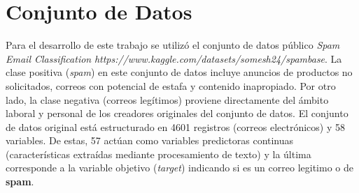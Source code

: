 \documentclass[a4paper,11pt]{book}
\begin{document}
\section{Conjunto de Datos}
Para el desarrollo de este trabajo se utilizó el conjunto de datos público \textit{Spam Email Classification}  \textit{https://www.kaggle.com/datasets/somesh24/spambase}. La clase positiva (\textit{spam}) en este conjunto de datos incluye anuncios de productos no solicitados, correos con potencial de estafa  y contenido inapropiado. Por otro lado, la clase negativa (correos legítimos) proviene directamente del ámbito laboral y personal de los creadores originales del conjunto de datos.
El conjunto de datos original está estructurado en 4601 registros (correos electrónicos) y 58 variables. De estas, 57 actúan como variables predictoras continuas (características extraídas mediante procesamiento de texto) y la última corresponde a la variable objetivo (\textit{target}) indicando si es un correo legitimo o de \textbf{spam}. 
\end{document}
